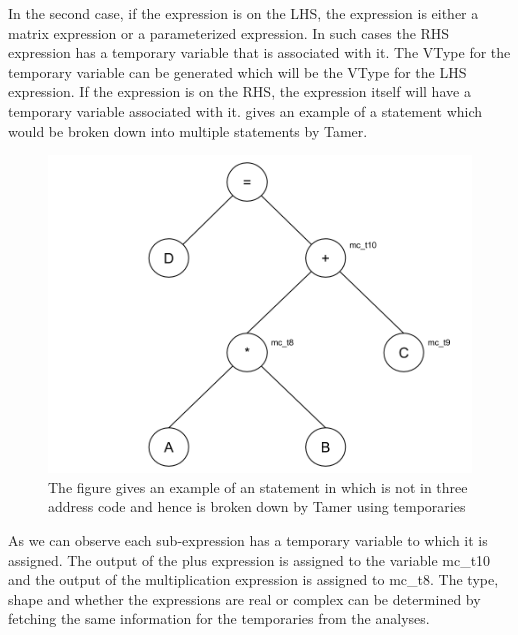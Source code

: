 In the second case, if the expression is on the LHS, the expression is either a matrix expression or a parameterized expression. In such cases the RHS expression has a temporary variable that is associated with it. The VType for the temporary variable can be generated which will be the VType for the LHS expression. If the expression is on the RHS, the expression itself will have a temporary variable associated with it.  gives an example of a statement which would be broken down into multiple statements by Tamer. 
\begin{figure}[htbp]
\begin{center}
\includegraphics[scale=0.5]{Figures/tac.png}
\caption[Statement in \matlab that is not three address code]{The figure gives an example of an statement in \matlab which is not in three address code and hence is broken down by Tamer using temporaries}
\label{Fig:tac}
\end{center}
\end{figure}
As we can observe each sub-expression has a temporary variable to which it is assigned. The output of the plus expression is assigned to the variable \textsf{mc\_t10} and the output of the multiplication expression is assigned to \textsf{mc\_t8}. The type, shape and whether the expressions are real or complex can be determined by fetching the same information for the temporaries from the analyses. 
